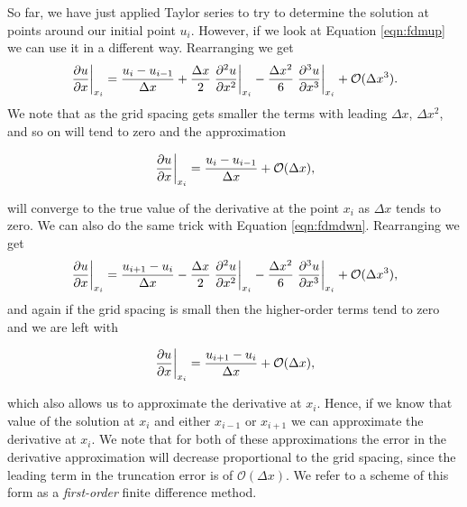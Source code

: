 So far, we have just applied Taylor series to try to determine the solution at points around our initial point $u_i$. However, if we look at Equation \ref{eqn:fdmup} we can use it in a different way. Rearranging we get
\begin{equation}
	\left.\frac{\partial u}{\partial x}\right\rvert_{x_i}^{} = \frac{u_i - u_{i-1}}{\Delta x} + \frac{\Delta x}{2} \left.\frac{\partial^2 u}{\partial x^2}\right\rvert_{x_i}^{} - \frac{\Delta x^2}{6} \left.\frac{\partial^3 u}{\partial x^3}\right\rvert_{x_i}^{} + \mathcal{O}(\Delta x^3).
	\label{eqn:fdmup1}
\end{equation}
We note that as the grid spacing gets smaller the terms with leading $\Delta x$, $\Delta x^2$, and so on will tend to zero and the approximation
\begin{eqBox}
\begin{equation}
	\left.\frac{\partial u}{\partial x}\right\rvert_{x_i}^{} = \frac{u_i - u_{i-1}}{\Delta x} + \mathcal{O}(\Delta x),
\end{equation}
\end{eqBox}
will converge to the true value of the derivative at the point $x_i$ as $\Delta x$ tends to zero. We can also do the same trick with Equation \ref{eqn:fdmdwn}. Rearranging we get
\begin{equation}
	\left.\frac{\partial u}{\partial x}\right\rvert_{x_i}^{} = \frac{u_{i+1} - u_{i}}{\Delta x} - \frac{\Delta x}{2} \left.\frac{\partial^2 u}{\partial x^2}\right\rvert_{x_i}^{} - \frac{\Delta x^2}{6} \left.\frac{\partial^3 u}{\partial x^3}\right\rvert_{x_i}^{} + \mathcal{O}(\Delta x^3),
	\label{eqn:fdmdwn1}
\end{equation}
and again if the grid spacing is small then the higher-order terms tend to zero and we are left with
\begin{eqBox}
\begin{equation}
	\left.\frac{\partial u}{\partial x}\right\rvert_{x_i}^{} = \frac{u_{i+1} - u_{i}}{\Delta x} + \mathcal{O}(\Delta x),
\end{equation}
\end{eqBox}
which also allows us to approximate the derivative at $x_i$. Hence, if we know that value of the solution at $x_i$ and either $x_{i-1}$ or $x_{i+1}$ we can approximate the derivative at $x_i$. We note that for both of these approximations the error in the derivative approximation will decrease proportional to the grid spacing, since the leading term in the truncation error is of $\mathcal{O}(\Delta x)$. We refer to a scheme of this form as a {\it first-order} finite difference method.

